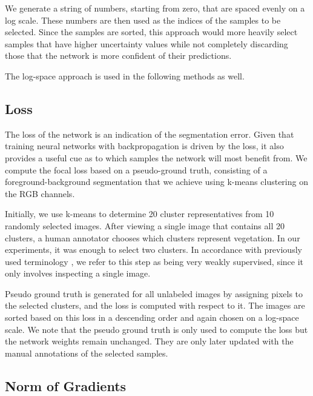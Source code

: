We generate a string of numbers, starting from zero, that are spaced evenly on a log scale. These numbers are then used as the indices of the samples to be selected. Since the samples are sorted, this approach would more heavily select samples that have higher uncertainty values while not completely discarding those that the network is more confident of their predictions. 

The log-space approach is used in the following methods as well.
\subsection{Loss} \label{sec:loss}

The loss of the network is an indication of the segmentation error. Given that training neural networks with backpropagation is driven by the loss, it also provides a useful cue as to which samples the network will most benefit from. We compute the focal loss \cite{DBLP:conf/iccv/LinGGHD17} based on a pseudo-ground truth, consisting of a foreground-background segmentation that we achieve using k-means clustering on the RGB channels.

Initially, we use k-means to determine 20 cluster representatives from 10 randomly selected images. After viewing a single image that contains all 20 clusters, a human annotator chooses which clusters represent vegetation. In our experiments, it was enough to select two clusters. In accordance with previously used terminology \cite{zhang2018self}, we refer to this step as being very weakly supervised, since it only involves inspecting a single image. 

Pseudo ground truth is generated for all unlabeled images by assigning pixels to the selected clusters, and the loss is computed with respect to it. The images are sorted based on this loss in a descending order and again chosen on a log-space scale. We note that the pseudo ground truth is only used to compute the loss but the network weights remain unchanged. They are only later updated with the manual annotations of the selected samples.


\subsection{Norm of Gradients} \label{sec:grad_norm}

